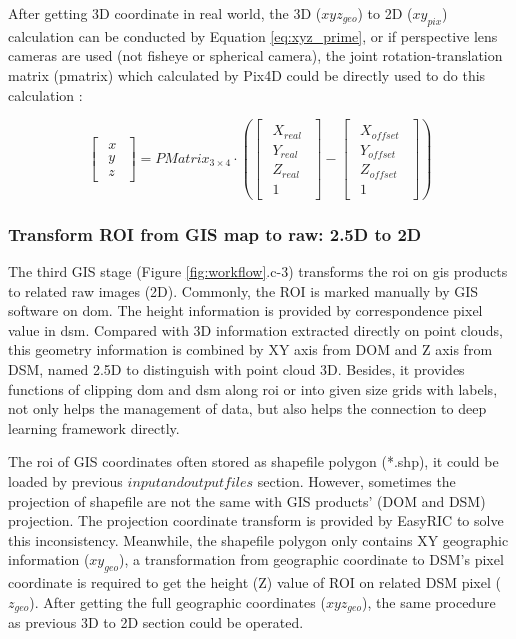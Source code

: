 \documentclass{configs/bmcart}
\begin{document}
After getting 3D coordinate in real world, the 3D ($xyz_{geo}$) to 2D ($xy_{pix}$) calculation can be conducted by Equation \ref{eq:xyz_prime}, or if perspective lens cameras are used (not fisheye or spherical camera), the joint rotation-translation matrix (pmatrix) which calculated by Pix4D could be directly used to do this calculation \cite{pix4d_support_what_2020}:

$$
\begin{bmatrix}\begin{matrix} x \\ y \\ z\end{matrix}\end{bmatrix}
= PMatrix_{3\times4} \cdot 
\left(\begin{bmatrix}\begin{matrix} 
  X_{real} \\ Y_{real} \\ Z_{real} \\ 1
\end{matrix}\end{bmatrix} 
- 
\begin{bmatrix}\begin{matrix} 
  X_{offset} \\ Y_{offset} \\ Z_{offset} \\ 1
\end{matrix}\end{bmatrix}
\right)
$$

\subsubsection*{Transform ROI from GIS map to raw: 2.5D to 2D}
The third GIS stage (Figure \ref{fig:workflow}.c-3) transforms the \acrfull*{roi} on \acrfull*{gis} products to related raw images (2D). Commonly, the ROI is marked manually by GIS software on \acrfull*{dom}. The height information is provided by correspondence pixel value in \acrfull*{dsm}. Compared with 3D information extracted directly on point clouds, this geometry information is combined by XY axis from DOM and Z axis from DSM, named 2.5D to distinguish with point cloud 3D. Besides, it provides functions of clipping \acrshort*{dom} and \acrshort*{dsm} along \acrshort*{roi} or into given size grids with labels, not only helps the management of data, but also helps the connection to deep learning framework directly.

The \acrfull*{roi} of GIS coordinates often stored as shapefile polygon (*.shp), it could be loaded by previous $input and output files$ section. However, sometimes the projection of shapefile are not the same with GIS products' (DOM and DSM) projection. The projection coordinate transform is provided by EasyRIC to solve this inconsistency. Meanwhile, the shapefile polygon only contains XY geographic information ($xy_{geo}$), a transformation from geographic coordinate to DSM's pixel coordinate is required to get the height (Z) value of ROI on related DSM pixel ($z_{geo}$). After getting the full geographic coordinates ($xyz_{geo}$), the same procedure as previous 3D to 2D section could be operated.
\end{document}
